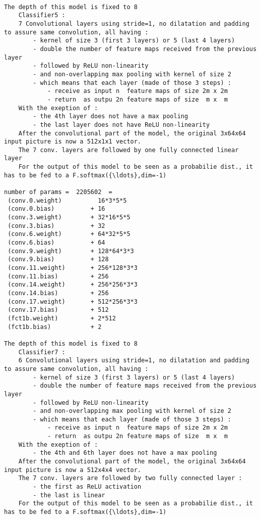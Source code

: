 \documentclass[11pt]{article}
\begin{document}
    \begin{Verbatim}[commandchars=\\\{\}]

The depth of this model is fixed to 8
    Classifier5 :
    7 Convolutional layers using stride=1, no dilatation and padding to assure same convolution, all having :
        - kernel of size 3 (first 3 layers) or 5 (last 4 layers)
        - double the number of feature maps received from the previous layer
        - followed by ReLU non-linearity 
        - and non-overlapping max pooling with kernel of size 2 
        - which means that each layer (made of those 3 steps) :
            - receive as input n  feature maps of size 2m x 2m
            - return  as outpu 2n feature maps of size  m x  m
    With the exeption of :
        - the 4th layer does not have a max pooling
        - the last layer does not have ReLU non-linearity
    After the convolutional part of the model, the original 3x64x64 input picture is now a 512x1x1 vector.
    The 7 conv. layers are followed by one fully connected linear layer
    For the output of this model to be seen as a probabilie dist., it has to be fed to a F.softmax({\ldots},dim=-1)
    
number of params =  2205602  =   
 (conv.0.weight)          16*3*5*5
 (conv.0.bias)          + 16
 (conv.3.weight)        + 32*16*5*5
 (conv.3.bias)          + 32
 (conv.6.weight)        + 64*32*5*5
 (conv.6.bias)          + 64
 (conv.9.weight)        + 128*64*3*3
 (conv.9.bias)          + 128
 (conv.11.weight)       + 256*128*3*3
 (conv.11.bias)         + 256
 (conv.14.weight)       + 256*256*3*3
 (conv.14.bias)         + 256
 (conv.17.weight)       + 512*256*3*3
 (conv.17.bias)         + 512
 (fct1b.weight)         + 2*512
 (fct1b.bias)           + 2

The depth of this model is fixed to 8
    Classifier7 :
    6 Convolutional layers using stride=1, no dilatation and padding to assure same convolution, all having :
        - kernel of size 3 (first 3 layers) or 5 (last 4 layers)
        - double the number of feature maps received from the previous layer
        - followed by ReLU non-linearity 
        - and non-overlapping max pooling with kernel of size 2 
        - which means that each layer (made of those 3 steps) :
            - receive as input n  feature maps of size 2m x 2m
            - return  as outpu 2n feature maps of size  m x  m
    With the exeption of :
        - the 4th and 6th layer does not have a max pooling
    After the convolutional part of the model, the original 3x64x64 input picture is now a 512x4x4 vector.
    The 7 conv. layers are followed by two fully connected layer :
        - the first as ReLU activation
        - the last is linear
    For the output of this model to be seen as a probabilie dist., it has to be fed to a F.softmax({\ldots},dim=-1)
    

\end{Verbatim}
\end{document}
